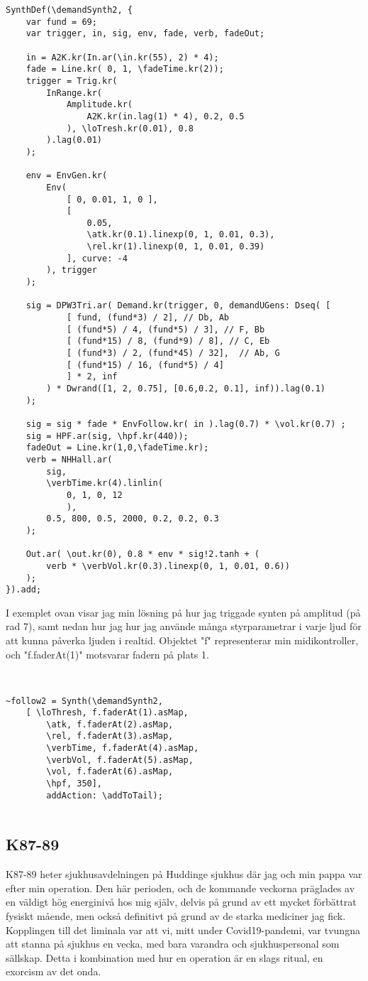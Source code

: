 \documentclass{article}
\begin{document}
\begin{lstlisting}[style=SuperCollider-IDE, caption=Amplitudtriggad synt]
SynthDef(\demandSynth2, {
	var fund = 69;
	var trigger, in, sig, env, fade, verb, fadeOut;

	in = A2K.kr(In.ar(\in.kr(55), 2) * 4);
	fade = Line.kr( 0, 1, \fadeTime.kr(2));
	trigger = Trig.kr(
		InRange.kr( 
			Amplitude.kr(
				A2K.kr(in.lag(1) * 4), 0.2, 0.5
			), \loTresh.kr(0.01), 0.8 
		).lag(0.01)
	);

	env = EnvGen.kr(
		Env( 
			[ 0, 0.01, 1, 0 ],
			[
				0.05,
				\atk.kr(0.1).linexp(0, 1, 0.01, 0.3),
				\rel.kr(1).linexp(0, 1, 0.01, 0.39) 
			], curve: -4
		), trigger
	);

	sig = DPW3Tri.ar( Demand.kr(trigger, 0, demandUGens: Dseq( [ 
			[ fund, (fund*3) / 2], // Db, Ab
			[ (fund*5) / 4, (fund*5) / 3], // F, Bb
			[ (fund*15) / 8, (fund*9) / 8], // C, Eb
			[ (fund*3) / 2, (fund*45) / 32],  // Ab, G
			[ (fund*15) / 16, (fund*5) / 4]
			] * 2, inf
		) * Dwrand([1, 2, 0.75], [0.6,0.2, 0.1], inf)).lag(0.1)
	);

	sig = sig * fade * EnvFollow.kr( in ).lag(0.7) * \vol.kr(0.7) ;
	sig = HPF.ar(sig, \hpf.kr(440));
	fadeOut = Line.kr(1,0,\fadeTime.kr);
	verb = NHHall.ar(
		sig, 
		\verbTime.kr(4).linlin(
			0, 1, 0, 12
			), 
		0.5, 800, 0.5, 2000, 0.2, 0.2, 0.3
	);

	Out.ar( \out.kr(0), 0.8 * env * sig!2.tanh + ( 
		verb * \verbVol.kr(0.3).linexp(0, 1, 0.01, 0.6))
	);  
}).add;
\end{lstlisting}


  I exemplet ovan visar jag min lösning på hur jag triggade synten på amplitud (på rad 7), samt nedan hur jag
  hur jag använde många styrparametrar i varje ljud för att kunna påverka ljuden i realtid. Objektet "f"
  representerar min midikontroller, och "f.faderAt(1)" motsvarar fadern på plats 1.


\begin{lstlisting}[style=SuperCollider-IDE, caption=Syntens kontrollschema]


~follow2 = Synth(\demandSynth2, 
	[ \loThresh, f.faderAt(1).asMap,
		\atk, f.faderAt(2).asMap,
		\rel, f.faderAt(3).asMap,
		\verbTime, f.faderAt(4).asMap,
		\verbVol, f.faderAt(5).asMap,
		\vol, f.faderAt(6).asMap,
		\hpf, 350],
		addAction: \addToTail); 
  
\end{lstlisting}

  \subsection{K87-89}
  K87-89 heter sjukhusavdelningen på Huddinge sjukhus där jag och min pappa var efter min operation. Den här
  perioden, och de kommande veckorna präglades av en väldigt hög energinivå hos mig själv, delvis på grund av
  ett mycket förbättrat fysiskt mående, men också definitivt på grund av de starka mediciner jag fick.
  Kopplingen till det liminala var att vi, mitt under Covid19-pandemi, var tvungna att stanna på sjukhus en
  vecka, med bara varandra och sjukhuspersonal som sällskap. Detta i kombination med hur en operation är en
  slags ritual, en exorcism av det onda. 
\end{document}
